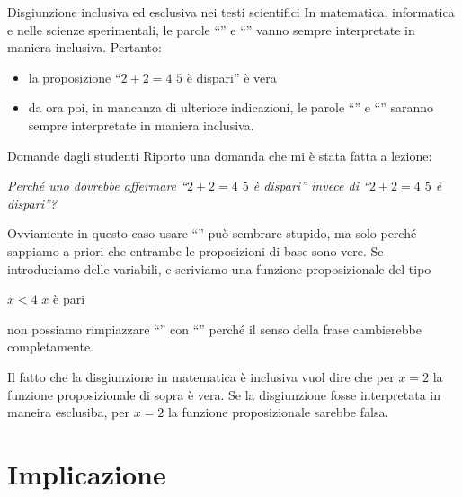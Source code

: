 \documentclass[aspectratio=169,10pt,dvipsnames,handout]{beamer}
\begin{document}
\begin{frame}{Disgiunzione inclusiva ed esclusiva nei testi scientifici}
    In matematica, informatica e nelle scienze sperimentali, le parole ``'' e ``'' vanno sempre interpretate in maniera inclusiva. Pertanto:
    \begin{itemize}
        \item la proposizione ``$2 + 2 = 4$  $5$ è dispari'' è vera
        \item da ora poi, in mancanza di ulteriore indicazioni, le parole ``'' e ``'' saranno sempre interpretate in maniera inclusiva.
    \end{itemize}
\end{frame}

\begin{frame}{Domande dagli studenti}
    Riporto una domanda che mi è stata fatta a lezione:

    \medskip
    \textit{Perché uno dovrebbe affermare ``$2 + 2 = 4$  $5$ è dispari'' invece di ``$2 + 2 = 4$  $5$ è dispari''?}

    \medskip
    Ovviamente in questo caso usare ``'' può sembrare stupido, ma solo perché sappiamo a priori che entrambe le proposizioni di base sono vere. Se introduciamo delle variabili, e scriviamo una funzione proposizionale del tipo
    \begin{center}
    $x < 4$  $x$ è pari
    \end{center}
    non possiamo rimpiazzare ``'' con ``'' perché il senso della frase cambierebbe completamente.

    \smallskip
    Il fatto che la disgiunzione in matematica è inclusiva vuol dire che per $x=2$ la funzione proposizionale di sopra è vera. Se la disgiunzione fosse interpretata in maneira esclusiba, per $x=2$ la funzione proposizionale sarebbe falsa.
\end{frame}

\section{Implicazione}
\end{document}

